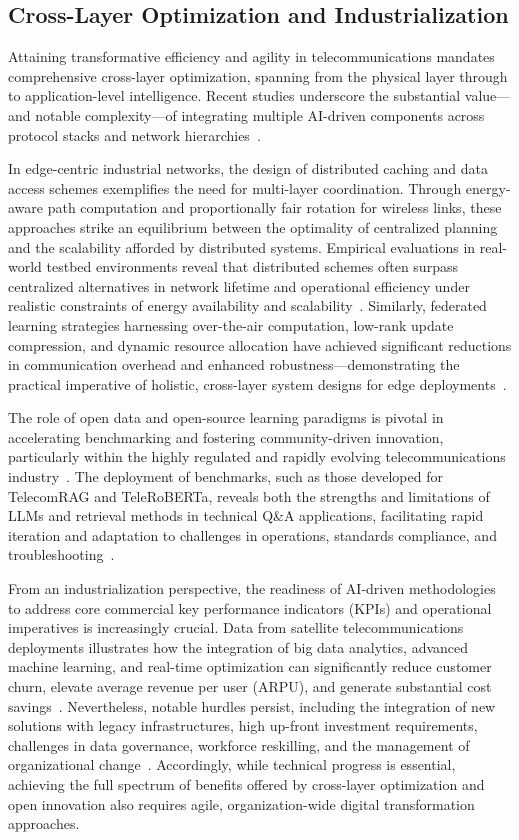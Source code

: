 \subsection{Cross-Layer Optimization and Industrialization}

Attaining transformative efficiency and agility in telecommunications mandates comprehensive cross-layer optimization, spanning from the physical layer through to application-level intelligence. Recent studies underscore the substantial value—and notable complexity—of integrating multiple AI-driven components across protocol stacks and network hierarchies~\cite{ref12, ref14, ref20, ref21, ref24, ref25, ref26, ref29}.

In edge-centric industrial networks, the design of distributed caching and data access schemes exemplifies the need for multi-layer coordination. Through energy-aware path computation and proportionally fair rotation for wireless links, these approaches strike an equilibrium between the optimality of centralized planning and the scalability afforded by distributed systems. Empirical evaluations in real-world testbed environments reveal that distributed schemes often surpass centralized alternatives in network lifetime and operational efficiency under realistic constraints of energy availability and scalability~\cite{ref14}. Similarly, federated learning strategies harnessing over-the-air computation, low-rank update compression, and dynamic resource allocation have achieved significant reductions in communication overhead and enhanced robustness—demonstrating the practical imperative of holistic, cross-layer system designs for edge deployments~\cite{ref12}.

The role of open data and open-source learning paradigms is pivotal in accelerating benchmarking and fostering community-driven innovation, particularly within the highly regulated and rapidly evolving telecommunications industry~\cite{ref11, ref21, ref22, ref23}. The deployment of benchmarks, such as those developed for TelecomRAG and TeleRoBERTa, reveals both the strengths and limitations of LLMs and retrieval methods in technical Q\&A applications, facilitating rapid iteration and adaptation to challenges in operations, standards compliance, and troubleshooting~\cite{ref23, ref29}.

From an industrialization perspective, the readiness of AI-driven methodologies to address core commercial key performance indicators (KPIs) and operational imperatives is increasingly crucial. Data from satellite telecommunications deployments illustrates how the integration of big data analytics, advanced machine learning, and real-time optimization can significantly reduce customer churn, elevate average revenue per user (ARPU), and generate substantial cost savings~\cite{ref49}. Nevertheless, notable hurdles persist, including the integration of new solutions with legacy infrastructures, high up-front investment requirements, challenges in data governance, workforce reskilling, and the management of organizational change~\cite{ref49}. Accordingly, while technical progress is essential, achieving the full spectrum of benefits offered by cross-layer optimization and open innovation also requires agile, organization-wide digital transformation approaches.

